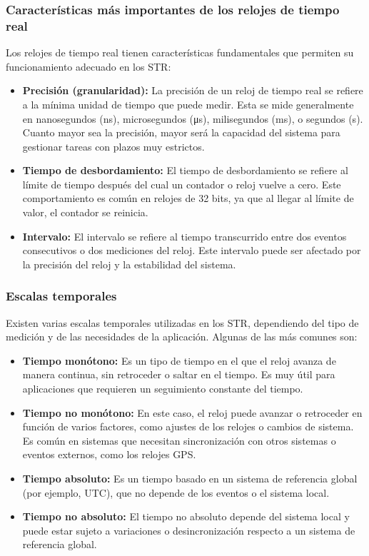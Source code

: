 \subsubsection{Características más importantes de los relojes de tiempo real}

Los relojes de tiempo real tienen características fundamentales que permiten su funcionamiento adecuado en los STR:

\begin{itemize}
    \item \textbf{Precisión (granularidad):} La precisión de un reloj de tiempo real se refiere a la mínima unidad de tiempo que puede medir. Esta se mide generalmente en nanosegundos (ns), microsegundos (μs), milisegundos (ms), o segundos (s). Cuanto mayor sea la precisión, mayor será la capacidad del sistema para gestionar tareas con plazos muy estrictos.
    
    \item \textbf{Tiempo de desbordamiento:} El tiempo de desbordamiento se refiere al límite de tiempo después del cual un contador o reloj vuelve a cero. Este comportamiento es común en relojes de 32 bits, ya que al llegar al límite de valor, el contador se reinicia.
    
    \item \textbf{Intervalo:} El intervalo se refiere al tiempo transcurrido entre dos eventos consecutivos o dos mediciones del reloj. Este intervalo puede ser afectado por la precisión del reloj y la estabilidad del sistema.
\end{itemize}

\subsubsection{Escalas temporales}
Existen varias escalas temporales utilizadas en los STR, dependiendo del tipo de medición y de las necesidades de la aplicación. Algunas de las más comunes son:

\begin{itemize}
    \item \textbf{Tiempo monótono:} Es un tipo de tiempo en el que el reloj avanza de manera continua, sin retroceder o saltar en el tiempo. Es muy útil para aplicaciones que requieren un seguimiento constante del tiempo.
    
    \item \textbf{Tiempo no monótono:} En este caso, el reloj puede avanzar o retroceder en función de varios factores, como ajustes de los relojes o cambios de sistema. Es común en sistemas que necesitan sincronización con otros sistemas o eventos externos, como los relojes GPS.
    
    \item \textbf{Tiempo absoluto:} Es un tiempo basado en un sistema de referencia global (por ejemplo, UTC), que no depende de los eventos o el sistema local.
    
    \item \textbf{Tiempo no absoluto:} El tiempo no absoluto depende del sistema local y puede estar sujeto a variaciones o desincronización respecto a un sistema de referencia global.
\end{itemize}

